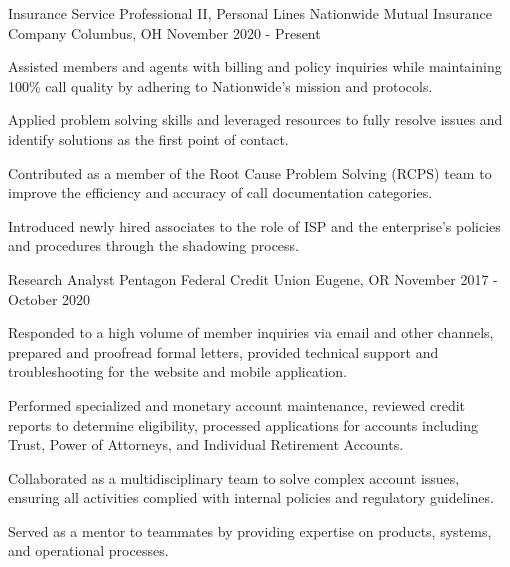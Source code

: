 
\begin{cventries}

  \cventry
    {Insurance Service Professional II, Personal Lines} %
    {Nationwide Mutual Insurance Company} %
    {Columbus, OH} %
    {November 2020 - Present} %
    {
      \begin{cvitems} %
        \item{Assisted members and agents with billing and policy inquiries while maintaining 100\% call quality by adhering to Nationwide's mission and protocols.}
        \item{Applied problem solving skills and leveraged resources to fully resolve issues and identify solutions as the first point of contact.}
        \item{Contributed as a member of the Root Cause Problem Solving (RCPS) team to improve the efficiency and accuracy of call documentation categories.}
        \item{Introduced newly hired associates to the role of ISP and the enterprise's policies and procedures through the shadowing process.}
         	\end{cvitems}
    } 

  \cventry
    {Research Analyst} %
    {Pentagon Federal Credit Union} %
    {Eugene, OR} %
    {November 2017 - October 2020} %
    {
      \begin{cvitems} %
        \item {Responded to a high volume of member inquiries via email and other channels, prepared and proofread formal letters, provided technical support and troubleshooting for the website and mobile application.}
        \item {Performed specialized and monetary account maintenance, reviewed credit reports to determine eligibility, processed applications for accounts including Trust, Power of Attorneys, and Individual Retirement Accounts.}
        \item {Collaborated as a multidisciplinary team to solve complex account issues, ensuring all activities complied with internal policies and regulatory guidelines.}
        \item {Served as a mentor to teammates by providing expertise on products, systems, and operational processes.}
         	\end{cvitems}
    } 


\end{cventries}
